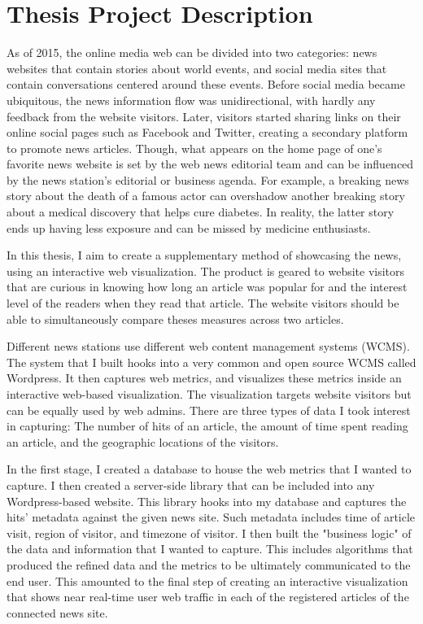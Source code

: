 \documentclass[12pt]{article}
\begin{document}
\begin{singlespace}
\tableofcontents
\end{singlespace}

\vfill

\section{Thesis Project Description}
As of 2015, the online media web can be divided into two categories: news websites that contain stories about world events, and social media sites that contain conversations centered around these events. Before social media became ubiquitous, the news information flow was unidirectional, with hardly any feedback from the website visitors. Later, visitors started sharing links on their online social pages such as Facebook and Twitter, creating a secondary platform to promote news articles. Though, what appears on the home page of one's favorite news website is set by the web news editorial team and can be influenced by the news station's editorial or business agenda. For example, a breaking news story about the death of a famous actor can overshadow another breaking story about a medical discovery that helps cure diabetes. In reality, the latter story ends up having less exposure and can be missed by medicine enthusiasts.  

In this thesis, I aim to create a supplementary method of showcasing the news, using an interactive web visualization. The product is geared to website visitors that are curious in knowing how long an article was popular for and the interest level of the readers when they read that article. The website visitors should be able to simultaneously compare theses measures across two articles. 

Different news stations use different web content management systems (WCMS). The system that I built hooks into a very common and open source WCMS called Wordpress. It then captures web metrics, and visualizes these metrics inside an interactive web-based visualization. The visualization targets website visitors but can be equally used by web admins. There are three types of data I took interest in capturing: The number of hits of an article, the amount of time spent reading an article, and the geographic locations of the visitors. 

In the first stage, I created a database to house the web metrics that I wanted to capture. I then created a server-side library that can be included into any Wordpress-based website. This library hooks into my database and captures the hits' metadata against the given news site. Such metadata includes time of article visit, region of visitor, and timezone of visitor.  
I then built the "business logic" of the data and information that I wanted to capture. This includes algorithms that produced the refined data and the metrics to be ultimately communicated to the end user.
This amounted to the final step of creating an interactive visualization that shows near real-time user web traffic in each of the registered articles of the connected news site.
\end{document}
